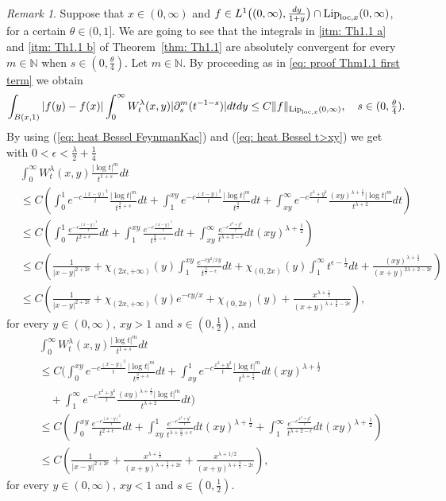 \documentclass[a4paper,10pt, reqno]{amsart}
\theoremstyle{definition}
\theoremstyle{remark}
\newtheorem{rem}[thm]{Remark}
\numberwithin{equation}{section}
\begin{document}
\begin{rem}\label{rem: log}
Suppose that $x\in (0,\infty)$ and  $f\in L^1\big((0,\infty),\frac{dy}{1+y}\big)\cap {\textup{Lip}}_{{\rm loc},x}(0,\infty)$, for a certain $\theta\in (0,1]$. We are going to see that the integrals in \ref{itm: Th1.1 a} and \ref{itm: Th1.1 b} of Theorem~\ref{thm: Th1.1} are absolutely convergent for every $m\in\mathbb{N}$ when $s\in (0,\tfrac{\theta}{4})$. Let $m\in \mathbb{N}$. By proceeding as in \eqref{eq: proof Thm1.1 first term} we obtain
\[
\int_{B(x,1)}|f(y)-f(x)|\int_0^\infty W_t^\lambda(x,y)|\partial_s^m (t^{-1-s})|dtdy\le C\|f\|_{{\textup{Lip}}_{{\rm loc},x}(0,\infty)},\quad s\in (0,\tfrac{\theta}{4}).
\]
By using (\ref{eq: heat Bessel FeynmanKac}) and (\ref{eq: heat Bessel t>xy}) we get with $0<\epsilon <\frac{\lambda}{2}+\frac{1}{4}$
\begin{align*}
&\int_0^\infty W_t^\lambda(x,y)\frac{|\log t|^m}{t^{1+s}}dt\\
&\le C\left(\int_0^1 e^{-c\frac{(x-y)^2}{t}}\frac{|\log t|^m}{t^{\frac{3}{2}+s}}dt+\int_1^{xy}e^{-c\frac{(x-y)^2}{t}}\frac{|\log t|^m}{t^{\frac{3}{2}}}dt+\int_{xy}^\infty e^{-c\frac{x^2+y^2}{t}}\frac{(xy)^{\lambda+\frac{1}{2}}|\log t|^m}{t^{\lambda+2}}dt\right)\\
&\le C\left(\int_0^1 \frac{e^{-c\frac{(x-y)^2}{t}}}{t^{2+\epsilon}}dt+\int_1^{xy}\frac{e^{-c\frac{(x-y)^2}{t}}}{t^{\frac{3}{2}-\epsilon}}dt+\int_{xy}^\infty\frac{ e^{-c\frac{x^2+y^2}{t}}}{t^{\lambda+2-\epsilon}}dt(xy)^{\lambda+\frac{1}{2}}\right)\\
&\le C\left(\frac{1}{|x-y|^{2+2\epsilon}}+\chi_{(2x,+\infty)}(y)\int_1^{xy}\frac{e^{-cy^2/xy}}{t^{\frac{3}{2}-\epsilon}}dt+\chi_{(0,2x)}(y)\int_1^\infty t^{\epsilon-\frac{1}{2}}dt+\frac{(xy)^{\lambda+\frac{1}{2}}}{(x+y)^{2\lambda+2-2\epsilon}}\right)\\
&\le C\left(\frac{1}{|x-y|^{2+2\epsilon}}+\chi_{(2x,+\infty)}(y){e^{-cy/x}}+\chi_{(0,2x)}(y)+\frac{x^{\lambda+\frac{1}{2}}}{(x+y)^{\lambda+\frac{3}{2}-2\epsilon}}\right),
\end{align*}
for every $y\in (0,\infty)$, $xy>1$ and $s\in (0,\frac{1}{2})$, and
\begin{align*}
&\int_0^\infty W_t^\lambda(x,y)\frac{|\log t|^m}{t^{1+s}}dt\\
&\le C\Bigg(\int_0^{xy} e^{-c\frac{(x-y)^2}{t}}\frac{|\log t|^m}{t^{\frac{3}{2}+s}}dt+\int_{xy}^{1}e^{-c\frac{x^2+y^2}{t}}\frac{|\log t|^m}{t^{\lambda+\frac{5}{2}}}dt(xy)^{\lambda+\frac{1}{2}}\\
&\quad +\int_{1}^\infty e^{-c\frac{x^2+y^2}{t}}\frac{(xy)^{\lambda+\frac{1}{2}}|\log t|^m}{t^{\lambda+2}}dt\Bigg)\\
&\le C\left(\int_0^{xy} \frac{e^{-c\frac{(x-y)^2}{t}}}{t^{2+\epsilon}}dt+\int_{xy}^1\frac{e^{-c\frac{x^2+y^2}{t}}}{t^{\lambda+\frac{5}{2}+\epsilon}}dt(xy)^{\lambda+\frac{1}{2}}+\int_{1}^\infty\frac{ e^{-c\frac{x^2+y^2}{t}}}{t^{\lambda+2-\epsilon}}dt(xy)^{\lambda+\frac{1}{2}}\right)\\
&\le C\left(\frac{1}{|x-y|^{2+2\epsilon}}+\frac{x^{\lambda+\frac{1}{2}}}{(x+y)^{\lambda+\frac{5}{2}+2\epsilon}}+\frac{x^{\lambda+1/2}}{(x+y)^{\lambda+\frac{3}{2}-2\epsilon}}\right),
\end{align*}
for every $y\in (0,\infty)$, $xy<1$ and $s\in (0,\frac{1}{2})$.


\end{rem}
\end{document}
